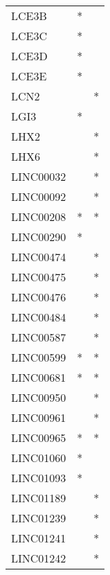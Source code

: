\begin{longtable}{lcc}
LCE3B                 &              * &            \\
LCE3C                 &              * &            \\
LCE3D                 &              * &            \\
LCE3E                 &              * &            \\
LCN2                  &                &          * \\
LGI3                  &              * &            \\
LHX2                  &                &          * \\
LHX6                  &                &          * \\
LINC00032             &                &          * \\
LINC00092             &                &          * \\
LINC00208             &              * &          * \\
LINC00290             &              * &            \\
LINC00474             &                &          * \\
LINC00475             &                &          * \\
LINC00476             &                &          * \\
LINC00484             &                &          * \\
LINC00587             &                &          * \\
LINC00599             &              * &          * \\
LINC00681             &              * &          * \\
LINC00950             &                &          * \\
LINC00961             &                &          * \\
LINC00965             &              * &          * \\
LINC01060             &              * &            \\
LINC01093             &              * &            \\
LINC01189             &                &          * \\
LINC01239             &                &          * \\
LINC01241             &                &          * \\
LINC01242             &                &          * \\

\end{longtable}
